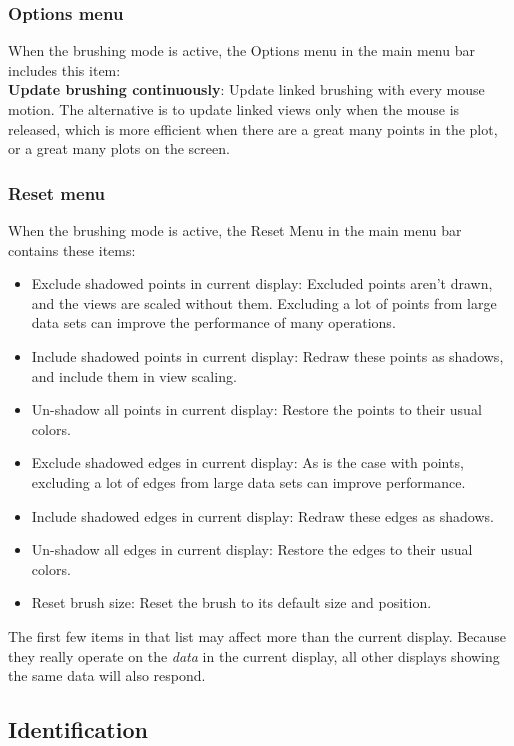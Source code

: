 \documentclass[11pt]{article}
\begin{document}
\subsubsection{Options menu}
%
When the brushing mode is active, the Options menu in the main
menu bar includes this item:
\medskip
\noindent
\\{\bf Update brushing continuously}: Update linked
  brushing with every mouse motion.  The alternative is to update linked
  views only when the mouse is released, which is more efficient when
  there are a great many points in the plot, or a great many plots on
  the screen.

\subsubsection{Reset menu}
%
When the brushing mode is active, the Reset Menu in the main
menu bar contains these items:

\begin{itemize}
 \item Exclude shadowed points in current display: Excluded points
       aren't drawn, and the views are scaled without them.  Excluding
       a lot of points from large data sets can improve the performance
       of many operations.
 \item Include shadowed points in current display: Redraw these points
       as shadows, and include them in view scaling.
 \item Un-shadow all points in current display: Restore the points to
       their usual colors.
 \item Exclude shadowed edges in current display: As is the case with
       points, excluding a lot of edges from large data sets can
       improve performance.
 \item Include shadowed edges in current display: Redraw these edges
       as shadows.
 \item Un-shadow all edges in current display: Restore the edges to their
       usual colors.
 \item Reset brush size: Reset the brush to its default size and position.
\end{itemize}
The first few items in that list may affect more than the current
display.  Because they really operate on the {\em data} in the current
display, all other displays showing the same data will also respond.

\subsection{Identification}
\label{slbl:Identify}
\end{document}
